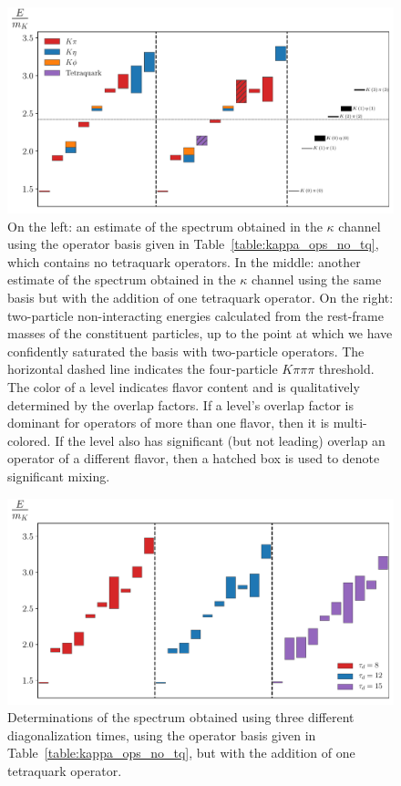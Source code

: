 \begin{figure}
  \centering
  \hspace*{-0.5in}\includegraphics[width=\textwidth]{figures/spectrum_a1g/staircase.pdf}
  \caption{On the left: an estimate of the spectrum obtained in the $\kappa$ channel using the operator basis given in Table~\ref{table:kappa_ops_no_tq}, which contains no tetraquark operators. In the middle: another estimate of the spectrum obtained in the $\kappa$ channel using the same basis but with the addition of one tetraquark operator. On the right: two-particle non-interacting energies calculated from the rest-frame masses of the constituent particles, up to the point at which we have confidently saturated the basis with two-particle operators. The horizontal dashed line indicates the four-particle $K\pi\pi\pi$ threshold. The color of a level indicates flavor content and is qualitatively determined by the overlap factors. If a level's overlap factor is dominant for operators of more than one flavor, then it is multi-colored. If the level also has significant (but not leading) overlap an operator of a different flavor, then a hatched box is used to denote significant mixing.}
  \label{fig:kappa_spectrum}
\end{figure}

\begin{figure}
  \centering
  \hspace*{-0.5in}\includegraphics[width=\textwidth]{figures/spectrum_a1g/staircase_tau_d.pdf}
  \caption{Determinations of the spectrum obtained using three different diagonalization times, using the operator basis given in Table~\ref{table:kappa_ops_no_tq}, but with the addition of one tetraquark operator.}
  \label{fig:spectrum_td}
\end{figure}

